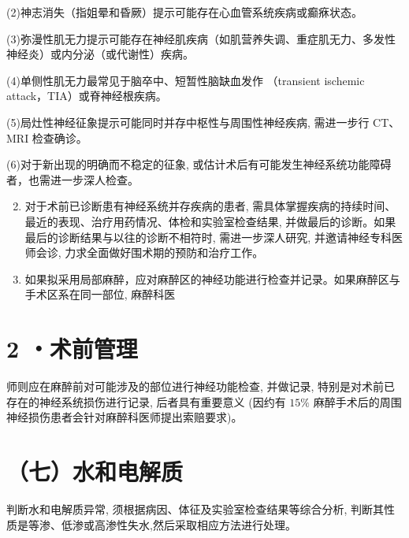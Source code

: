 \documentclass[10pt]{article}
\begin{document}
(2)神志消失（指姐晕和昏厥）提示可能存在心血管系统疾病或癫㾋状态。

(3)弥漫性肌无力提示可能存在神经肌疾病（如肌营养失调、重症肌无力、多发性神经炎）或内分泌（或代谢性）疾病。

(4)单侧性肌无力最常见于脑卒中、短暂性脑缺血发作 （transient ischemic attack，TIA）或脊神经根疾病。

(5)局灶性神经征象提示可能同时并存中枢性与周围性神经疾病, 需进一步行 CT、MRI 检查确诊。

(6)对于新出现的明确而不稳定的征象, 或估计术后有可能发生神经系统功能障碍者，也需进一步深人检查。

\begin{enumerate}
  \setcounter{enumi}{1}
  \item 对于术前已诊断患有神经系统并存疾病的患者, 需具体掌握疾病的持续时间、最近的表现、治疗用药情况、体检和实验室检查结果, 并做最后的诊断。如果最后的诊断结果与以往的诊断不相符时, 需进一步深人研究, 并邀请神经专科医师会诊, 力求全面做好围术期的预防和治疗工作。

  \item 如果拟采用局部麻醉，应对麻醉区的神经功能进行检查并记录。如果麻醉区与手术区系在同一部位, 麻醉科医

\end{enumerate}

\section*{2 ・术前管理}
师则应在麻醉前对可能涉及的部位进行神经功能检查, 并做记录, 特别是对术前已存在的神经系统损伤进行记录, 后者具有重要意义 (因约有 $15 \%$ 麻醉手术后的周围神经损伤患者会针对麻醉科医师提出索赔要求)。

\section*{（七）水和电解质}
判断水和电解质异常, 须根据病因、体征及实验室检查结果等综合分析, 判断其性质是等渗、低渗或高渗性失水,然后采取相应方法进行处理。
\end{document}
